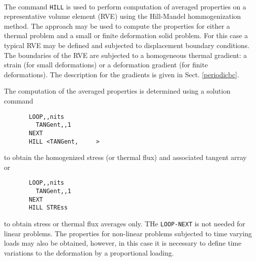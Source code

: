  \\{\smallskip}
\headb

The command {\tt HILL} is used to perform computation of averaged properties
on a representative volume element (RVE) using the Hill-Mandel hommogenization
method.  The approach may be used to compute the properties for either
a thermal problem and a small or finite deformation solid problem.
For this case a typical RVE may be defined and subjected to
displacement boundary
conditions. The boundaries of the RVE are subjected to a homogeneous 
thermal gradient: a strain
(for small deformations) or a deformation gradient (for finite deformations).
The description for the gradients is given in Sect. \ref{periodicbc}.

The computation of the averaged properties is determined using a solution
command
\begin{verbatim}
       LOOP,,nits
         TANGent,,1
       NEXT
       HILL <TANGent,     >
\end{verbatim}
to obtain the homogenized stress (or thermal flux) and associated tangent array
or
\begin{verbatim}
       LOOP,,nits
         TANGent,,1
       NEXT
       HILL STREss
\end{verbatim}
to obtain stress or thermal flux averages only. 
THe \texttt{LOOP-NEXT} is not needed for linear problems.
The properties for non-linear problems subjected to time varying loads may
also be obtained, however, in this case it is necessary to define
time variations to the deformation by a proportional loading.
\vfill\eject
